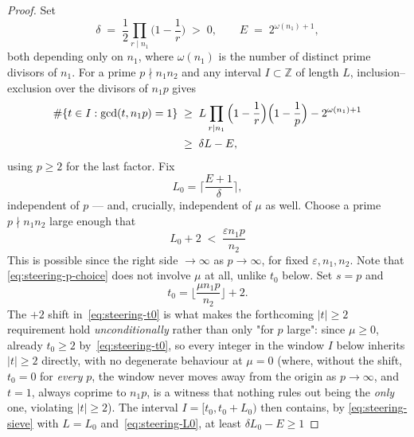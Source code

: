 \documentclass[10pt,a4paper]{amsart}
\newcommand{\Z}{\mathbb{Z}}
\begin{document}
\begin{proof}
  Set
  \begin{equation}
    \label{eq:steering-constants}
    \delta \;=\; \frac12\prod_{r\mid n_1}\Big(1-\frac1r\Big) \;>\; 0, \qquad E \;=\;
    2^{\omega(n_1)+1},
  \end{equation}
  both depending only on \(n_1\), where \(\omega(n_1)\) is the number of distinct prime divisors of
  \(n_1\). For a prime \(p\nmid n_1n_2\) and any interval \(I\subset\Z\) of length \(L\),
  inclusion--exclusion over the divisors of \(n_1p\) gives
  \begin{align}
    \#\{t\in I : \gcd(t,n_1p)=1\}
      &\;\ge\; L\prod_{r\mid n_1}\Big(1-\frac1r\Big)\Big(1-\frac1p\Big) - 2^{\omega(n_1)+1} \notag\\
      &\;\ge\; \delta L - E, \label{eq:steering-sieve}
  \end{align}
  using \(p\ge2\) for the last factor. Fix
  \begin{equation}
    \label{eq:steering-L0}
    L_0 = \Big\lceil \frac{E+1}{\delta} \Big\rceil,
  \end{equation}
  independent of \(p\) --- and, crucially, independent of \(\mu\) as well. Choose a prime \(p\nmid n_1n_2\)
  large enough that
  \begin{equation}
    \label{eq:steering-p-choice}
    L_0 + 2 \;<\; \frac{\varepsilon n_1p}{n_2}
  \end{equation}
  This is possible since the right side \(\to\infty\) as \(p\to\infty\), for fixed
  \(\varepsilon,n_1,n_2\). Note that \eqref{eq:steering-p-choice} does not involve \(\mu\) at all,
  unlike \(t_0\) below. Set \(s=p\) and
  \begin{equation}
    \label{eq:steering-t0}
    t_0 = \Big\lfloor \frac{\mu n_1p}{n_2} \Big\rfloor + 2.
  \end{equation}
  The \(+2\) shift in~\eqref{eq:steering-t0} is what
  makes the forthcoming \(|t|\ge2\) requirement hold \emph{unconditionally} rather than only "for \(p\)
  large": since \(\mu\ge0\), already \(t_0\ge2\) by~\eqref{eq:steering-t0}, so every integer in the
  window \(I\) below inherits \(|t|\ge2\) directly, with no degenerate behaviour at \(\mu=0\) (where,
  without the shift, \(t_0=0\) for \emph{every} \(p\), the window never moves away from the origin as
  \(p\to\infty\), and \(t=1\), always coprime to \(n_1p\), is a witness that nothing rules out being
  the \emph{only} one, violating \(|t|\ge2\)). The interval \(I=[t_0,t_0+L_0)\) then contains, by
  \eqref{eq:steering-sieve} with \(L=L_0\) and~\eqref{eq:steering-L0}, at least \(\delta L_0-E\ge1\)

\end{proof}
\end{document}
